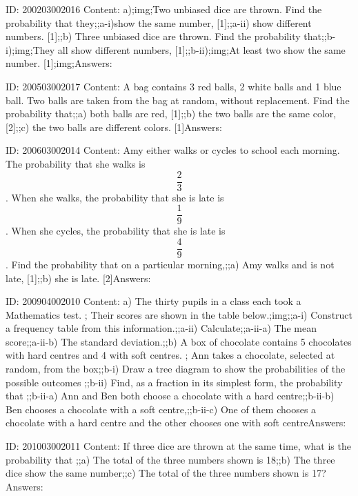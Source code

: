 \documentclass{article}
\begin{document}
ID: 200203002016
Content:
a);img;Two unbiased dice are thrown. Find the probability that they;;a-i)show the same number,   [1];;a-ii) show different numbers.   [1];;b) Three unbiased dice are thrown. Find the probability that;;b-i);img;They all show different numbers,   [1];;b-ii);img;At least two show the same number.   [1];img;Answers:

ID: 200503002017
Content:
A bag contains 3 red balls, 2 white balls and 1 blue ball. Two balls are taken from the bag at random, without replacement. Find the probability that;;a) both balls are red, [1];;b) the two balls are the same color, [2];;c) the two balls are different colors. [1]Answers:

ID: 200603002014
Content:
Amy either walks or cycles to school each morning. The probability that she walks is $$\frac{2}{3}$$. When she walks, the probability that she is late is $$\frac{1}{9}$$. When she cycles, the probability that she is late is $$\frac{4}{9}$$. Find the probability that on a particular morning,;;a) Amy walks and is not late, [1];;b) she is late. [2]Answers:

ID: 200904002010
Content:
a) The thirty pupils in a class each took a Mathematics test. ; Their scores are shown in the table below.;img;;a-i) Construct a frequency table from this information.;;a-ii) Calculate;;a-ii-a) The mean score;;a-ii-b) The standard deviation.;;b) A box of chocolate contains 5 chocolates with hard centres and 4 with soft centres. ; Ann takes a chocolate, selected at random, from the box;;b-i) Draw a tree diagram to show the probabilities of the possible outcomes ;;b-ii) Find, as a fraction in its simplest form, the probability that ;;b-ii-a) Ann and Ben both choose a chocolate with a hard centre;;b-ii-b) Ben chooses a chocolate with a soft centre,;;b-ii-c) One of them chooses a chocolate with a hard centre and the other chooses one with soft centreAnswers:

ID: 201003002011
Content:
If three dice are thrown at the same time, what is the probability that ;;a) The total of the three numbers shown is 18;;b) The three dice show the same number;;c) The total of the three numbers shown is 17?Answers:
\end{document}
